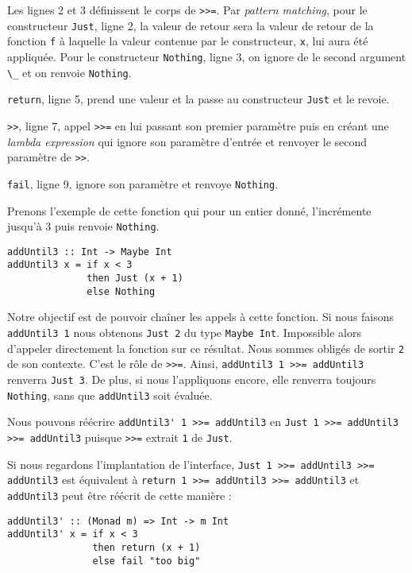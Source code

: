 \documentclass{llncs}
\begin{document}
Les lignes 2 et 3 définissent le corps de \lstinline{>>=}.
Par \emph{pattern matching}, pour le constructeur \lstinline{Just}, ligne 2,
la valeur de retour sera la valeur de retour de la fonction \lstinline{f} à
laquelle la valeur contenue par le constructeur, \lstinline{x}, lui aura été appliquée.
Pour le constructeur \lstinline{Nothing}, ligne 3, on ignore de le second argument
\lstinline{\_} et on renvoie \lstinline{Nothing}.

\lstinline{return}, ligne 5, prend une valeur et la passe au constructeur
\lstinline{Just} et le revoie.

\lstinline{>>}, ligne 7, appel \lstinline{>>=} en lui passant son premier paramètre
puis en créant une \emph{lambda expression} qui ignore son paramètre d'entrée
et renvoyer le second paramètre de \lstinline{>>}.

\lstinline{fail}, ligne 9, ignore son paramètre et renvoye \lstinline{Nothing}.

Prenons l'exemple de cette fonction qui pour un entier donné, l'incrémente jusqu'à
3 puis renvoie \lstinline{Nothing}.
\begin{lstlisting}
addUntil3 :: Int -> Maybe Int
addUntil3 x = if x < 3
              then Just (x + 1)
              else Nothing
\end{lstlisting}

Notre objectif est de pouvoir chaîner les appels à cette fonction.
Si nous faisons \lstinline{addUntil3 1} nous obtenons \lstinline{Just 2} du type \lstinline{Maybe Int}.
Impossible alors d'appeler directement la fonction sur ce résultat.
Nous sommes obligés de sortir \lstinline{2} de son contexte.
C'est le rôle de \lstinline{>>=}.
Ainsi, \lstinline{addUntil3 1 >>= addUntil3} renverra \lstinline{Just 3}.
De plus, si nous l'appliquons encore, elle renverra toujours \lstinline{Nothing},
sans que \lstinline{addUntil3} soit évaluée.

Nous pouvons réécrire \lstinline{addUntil3' 1 >>= addUntil3} en \lstinline{Just 1 >>= addUntil3 >>= addUntil3}
puisque \lstinline{>>=} extrait \lstinline{1} de \lstinline{Just}.

Si nous regardons l'implantation de l'interface, \lstinline{Just 1 >>= addUntil3 >>= addUntil3}
est équivalent à \lstinline{return 1 >>= addUntil3 >>= addUntil3} et \lstinline{addUntil3}
peut être réécrit de cette manière :
\begin{lstlisting}
addUntil3' :: (Monad m) => Int -> m Int
addUntil3' x = if x < 3
               then return (x + 1)
               else fail "too big"
\end{lstlisting}
\end{document}
